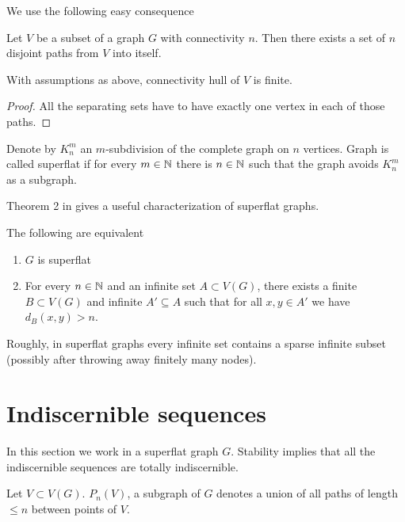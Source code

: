 We use the following easy consequence

\begin{Corollary} \label{cr_disjoint_paths}
	Let $V$ be a subset of a graph $G$ with connectivity $n$. Then there exists a set of $n$ disjoint paths from $V$ into itself.
\end{Corollary}

\begin{Corollary} \label{cr_hull_finite}
	With assumptions as above, connectivity hull of $V$ is finite.
\end{Corollary}

\begin{proof}
	All the separating sets have to have exactly one vertex in each of those paths. 
\end{proof}

\begin{Definition}
	Denote by $K^m_n$ an $m$-subdivision of the complete graph on $n$ vertices.
	Graph is called superflat if for every $m \in \mathbb{N}$ there is $n \in \mathbb{N}$ such that the graph avoids $K^m_n$ as a subgraph. 
\end{Definition}

Theorem 2 in \cite{stable_graphs} gives a useful characterization of superflat graphs.

\begin{Theorem} \label{th_superflat_equivalence}
	The following are equivalent
	\begin{enumerate}
		\item $G$ is superflat
		\item For every $n \in \mathbb{N}$ and an infinite set $A \subset V(G)$, there exists a finite $B \subset V(G)$ and infinite $A' \subseteq A$ such that for all $x,y \in A'$ we have $d_{B}(x, y) > n$.
	\end{enumerate}
\end{Theorem}

Roughly, in superflat graphs every infinite set contains a sparse infinite subset (possibly after throwing away finitely many nodes).

\section{Indiscernible sequences}

In this section we work in a superflat graph $G$. Stability implies that all the indiscernible sequences are totally indiscernible.

\begin{Definition}
	Let $V \subset V(G)$. $P_n(V)$, a subgraph of $G$ denotes a union of all paths of length $\leq n$ between points of $V$.
\end{Definition}

